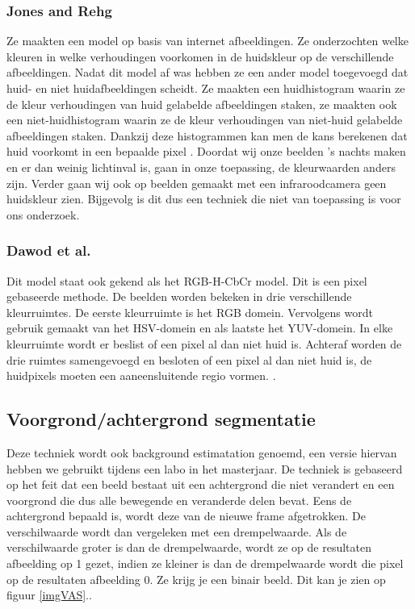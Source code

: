 \subsubsection{Jones and Rehg}
Ze maakten een model op basis van internet afbeeldingen. Ze onderzochten welke kleuren in welke verhoudingen voorkomen in de huidskleur op de verschillende afbeeldingen. Nadat dit model af was hebben ze een ander model toegevoegd dat huid- en niet huidafbeeldingen scheidt. Ze maakten een huidhistogram waarin ze de kleur verhoudingen van huid gelabelde afbeeldingen staken, ze maakten ook een niet-huidhistogram waarin ze de kleur verhoudingen van niet-huid gelabelde afbeeldingen staken. Dankzij deze histogrammen kan men de kans berekenen dat huid voorkomt in een bepaalde pixel \cite{bibTHK}. Doordat wij onze beelden 's nachts maken en er dan weinig lichtinval is, gaan in onze toepassing, de kleurwaarden anders zijn. Verder gaan wij ook op beelden gemaakt met een infraroodcamera geen huidskleur zien. Bijgevolg is dit dus een techniek die niet van toepassing is voor ons onderzoek. 

\subsubsection{Dawod et al.}
Dit model staat ook gekend als het RGB-H-CbCr model. Dit is een pixel gebaseerde methode. De beelden worden bekeken in drie verschillende kleurruimtes. De eerste kleurruimte is het RGB domein. Vervolgens wordt gebruik gemaakt van het HSV-domein en als laatste het YUV-domein. In elke kleurruimte wordt er beslist of een pixel al dan niet huid is. Achteraf worden de drie ruimtes samengevoegd en besloten of een pixel al dan niet huid is, de huidpixels moeten een aaneensluitende regio vormen. \cite{bibTHK}.

\subsection{Voorgrond/achtergrond segmentatie}
\label{refBET}
Deze techniek wordt ook background estimatation genoemd, een versie hiervan hebben we gebruikt tijdens een labo in het masterjaar. De techniek is gebaseerd op het feit dat een beeld bestaat uit een achtergrond die niet verandert en een voorgrond die dus alle bewegende en veranderde delen bevat. Eens de achtergrond bepaald is, wordt deze van de nieuwe frame afgetrokken. De verschilwaarde wordt dan vergeleken met een drempelwaarde. Als de verschilwaarde groter is dan de drempelwaarde, wordt ze op de resultaten afbeelding op 1 gezet, indien ze kleiner is dan de  drempelwaarde wordt die pixel op de resultaten afbeelding 0. Ze krijg je een binair beeld. Dit kan je zien op figuur \ref{imgVAS}.\cite{bibVAS}.

